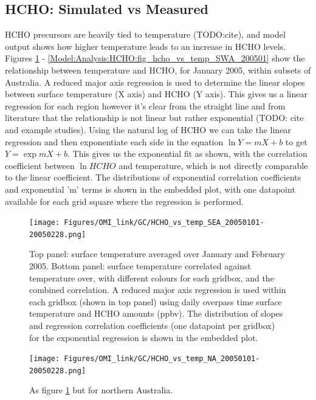  \subsection{HCHO: Simulated vs Measured}
  \label{Model:Analysis:HCHO}
    
    HCHO precursors are heavily tied to temperature (TODO:cite), and model output shows how higher temperature leads to an increase in HCHO levels.
    Figures \ref{Model:Analysis:HCHO:fig_hcho_vs_temp_SEA_200501} - \ref{Model:Analysis:HCHO:fig_hcho_vs_temp_SWA_200501} show the relationship between temperature and HCHO, for January 2005, within subsets of Australia.
    A reduced major axis regression is used to determine the linear slopes between surface temperature (X axis) and HCHO (Y axis).
    This gives us a linear regression for each region however it's clear from the straight line and from literature that the relationship is not linear but rather exponential (TODO: cite and example studies).
    Using the natural log of HCHO we can take the linear regression and then exponentiate each side in the equation $\ln{Y} = m{X}+b$ to get ${Y} = \exp{m{X}+b}$. 
    This gives us the exponential fit as shown, with the correlation coefficient between $\ln{HCHO}$ and temperature, which is not directly comparable to the linear coefficient.
    The distributions of exponential correlation coefficients and exponential 'm' terms is shown in the embedded plot, with one datapoint available for each grid square where the regression is performed.
    
    
    \begin{figure}
      \texttt{[image: Figures/OMI\_link/GC/HCHO\_vs\_temp\_SEA\_20050101-20050228.png]}
      \caption{%
        Top panel: surface temperature averaged over January and February 2005.
        Bottom panel: surface temperature correlated against temperature over, with different colours for each gridbox, and the combined correlation. 
        A reduced major axis regression is used within each gridbox (shown in top panel) using daily overpass time surface temperature and HCHO amounts (ppbv).
        The distribution of slopes and regression correlation coefficients (one datapoint per gridbox) for the exponential regression is shown in the embedded plot.
      }
      \label{Model:Analysis:HCHO:fig_hcho_vs_temp_SEA_200501}
    \end{figure}
    
    \begin{figure}
      \texttt{[image: Figures/OMI\_link/GC/HCHO\_vs\_temp\_NA\_20050101-20050228.png]}
      \caption{%
        As figure \ref{Model:Analysis:HCHO:fig_hcho_vs_temp_SEA_200501} but for northern Australia.
      }
      \label{Model:Analysis:HCHO:fig_hcho_vs_temp_NA_200501}
    \end{figure}
    
